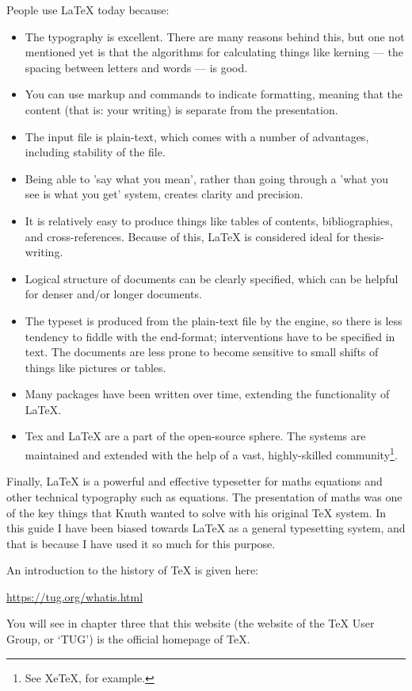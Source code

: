 \documentclass[11pt, oneside]{memoir}
\begin{document}
People use LaTeX today because:
\begin{itemize}
    \item The typography is excellent. There are many reasons behind this, but one not mentioned yet is that the algorithms for calculating things like kerning — the spacing between letters and words — is good.
    \item You can use markup and commands to indicate formatting, meaning that the content (that is: your writing) is separate from the presentation.
    \item The input file is plain-text, which comes with a number of advantages, including stability of the file. 
    \item Being able to 'say what you mean', rather than going through a 'what you see is what you get' system, creates clarity and precision.
    \item It is relatively easy to produce things like tables of contents, bibliographies, and cross-references. Because of this, LaTeX is considered ideal for thesis-writing.
    \item Logical structure of documents can be clearly specified, which can be helpful for denser and/or longer documents.
    \item The typeset is produced from the plain-text file by the engine, so there is less tendency to fiddle with the end-format; interventions have to be specified in text. The documents are less prone to become sensitive to small shifts of things like pictures or tables.
    \item Many packages have been written over time, extending the functionality of LaTeX.
    \item Tex and LaTeX are a part of the open-source sphere. The systems are maintained and extended with the help of a vast, highly-skilled community\footnote{See XeTeX, for example.}.
\end{itemize}

Finally, LaTeX is a powerful and effective typesetter for maths equations and other technical typography such as equations. The presentation of maths was one of the key things that Knuth wanted to solve with his original TeX system. In this guide I have been biased towards LaTeX as a general typesetting system, and that is because I have used it so much for this purpose.

An introduction to the history of TeX is given here:

\url{https://tug.org/whatis.html}

You will see in chapter three that this website (the website of the TeX User Group, or `TUG') is the official homepage of TeX.
\end{document}
